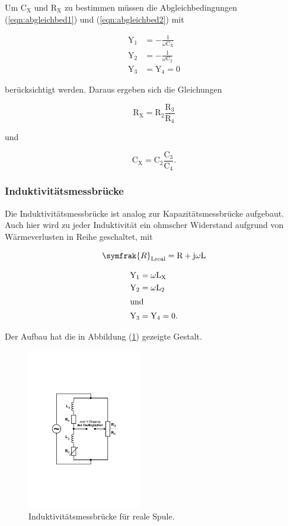 \noindent
Um $\text{C}_\text{X}$ und $\text{R}_\text{X}$ zu bestimmen müssen die Abgleichbedingungen (\ref{eqn:abgleichbed1}) und (\ref{eqn:abgleichbed2}) mit

\begin{align*}
\text{Y}_1 &= -\frac{1}{\omega\text{C}_\text{X}}\\
\text{Y}_2 &= -\frac{1}{\omega\text{C}_2}\\
\text{Y}_3 &= \text{Y}_4 = 0
\end{align*}

\noindent
berücksichtigt werden.
Daraus ergeben sich die Gleichungen

\begin{equation}
\text{R}_\text{X} = \text{R}_2 \frac{\text{R}_3}{\text{R}_4}
\label{eqn:r_x}
\end{equation}

\noindent
und 

\begin{equation}
\text{C}_\text{X} = \text{C}_2 \frac{\text{C}_3}{\text{C}_4}  .
\label{eqn:c_x}
\end{equation}

\subsubsection{Induktivitätsmessbrücke}
Die Induktivitätsmessbrücke ist analog zur Kapazitätsmessbrücke aufgebaut.
Auch hier wird zu jeder Induktivität ein ohmscher Widerstand aufgrund von Wärmeverlusten in Reihe geschaltet, mit

\begin{equation}
\symfrak{R}_\text{Lreal}= \text{R}+\text{j} \omega \text{L}  
\label{eqn:r_lreal}
\end{equation}

\begin{align*}
\text{Y}_1 &= \omega\text{L}_\text{X}\\
\text{Y}_2 &= \omega\text{L}_2\\
\shortintertext{und}
\text{Y}_3 &= \text{Y}_4 = 0  .
\end{align*}

\noindent
Der Aufbau hat die in Abbildung (\ref{fig:induktiv})
gezeigte Gestalt.

\begin{figure}
            \centering
               \includegraphics[height=7cm]{induktiv.pdf}
               \caption{Induktivitätsmessbrücke für reale Spule.}
               \label{fig:induktiv}
        \end{figure}

